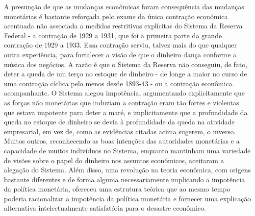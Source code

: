 \documentclass[a4paper,12pt]{article}[abntex2]
\begin{document}
A presunção de que as mudanças econômicas foram consequência das mudanças monetárias é bastante reforçada pelo exame da única contração econômica acentuada não associada a medidas restritivas explícitas do Sistema da Reserva Federal - a contração de 1929 a 1931, que foi a primeira parte da grande contração de 1929 a 1933. Essa contração serviu, talvez mais do que qualquer outra experiência, para fortalecer a visão de que o dinheiro dança conforme a música dos negócios. A razão é que o Sistema da Reserva não conseguiu, de fato, deter a queda de um terço no estoque de dinheiro - de longe a maior no curso de uma contração cíclica pelo menos desde 1893-43 - ou a contração econômica acompanhante. O Sistema alegou impotência, argumentando explicitamente que as forças não monetárias que induziam a contração eram tão fortes e violentas que estava impotente para deter a maré, e implicitamente que a profundidade da queda no estoque de dinheiro se devia à profundidade da queda na atividade empresarial, em vez de, como as evidências citadas acima sugerem, o inverso. Muitos outros, reconhecendo as boas intenções das autoridades monetárias e a capacidade de muitos indivíduos no Sistema, enquanto mantinham uma variedade de visões sobre o papel do dinheiro nos assuntos econômicos, aceitaram a alegação do Sistema. Além disso, uma revolução na teoria econômica, com origens bastante diferentes e de forma alguma necessariamente implicando a impotência da política monetária, ofereceu uma estrutura teórica que ao mesmo tempo poderia racionalizar a impotência da política monetária e fornecer uma explicação alternativa intelectualmente satisfatória para o desastre econômico.
\end{document}
